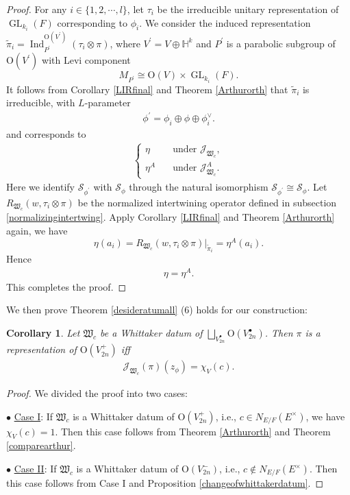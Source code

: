 \documentclass[article]{article}
\numberwithin{equation}{section}
\newtheorem{corollary}[theorem]{Corollary}
\theoremstyle{definition}
\DeclareMathOperator{\Ind}{Ind}
\DeclareMathOperator{\GL}{GL}
\begin{document}
\begin{proof}
For any $i\in \{1,2,\cdots, l\}$, let $\tau_{i}$ be the irreducible unitary representation of $\GL_{k_{i}}(F)$ corresponding to $\phi_{i}$. We consider the induced representation $\widetilde{\pi}_i=\Ind_{P^\prime}^{\mathrm O(V^\prime)}(\tau_i\otimes\pi)$, where $V^\prime= V\oplus \mathbb H^k$ and $P^\prime$ is a parabolic subgroup of $\mathrm O(V^\prime)$ with Levi component $$M_{P^\prime}\cong \mathrm O(V)\times \GL_{k_{i}}(F).$$
It follows from Corollary \ref{LIRfinal} and Theorem \ref{Arthurorth} that $\widetilde{\pi}_i$ is irreducible, with $L$-parameter 
\begin{align*}
\phi^\prime =\phi_i \oplus \phi \oplus \phi_i^{\vee}.
\end{align*}
and corresponds to 
\begin{align*}
\begin{cases*}
\eta \quad &\mbox{under $\mathcal J_{\mathfrak W_c}$},\\
\eta^A \quad &\mbox{under $\mathcal J^A_{\mathfrak W_c}$}. 
\end{cases*}
\end{align*}
Here we identify $\mathcal S_{\phi^\prime}$ with $\mathcal {S}_{\phi}$ through the natural isomorphism $\mathcal S_{\phi^\prime}\cong \mathcal {S}_{\phi}$. Let $R_{\mathfrak W_c}(w,\tau_{i}\otimes\pi)$ be the normalized intertwining operator defined in subsection \ref{normalizingintertwing}. Apply Corollary \ref{LIRfinal} and Theorem \ref{Arthurorth} again, we  have 
\begin{equation}\label{102}
\eta(a_i)=R_{\mathfrak W_c}(w,\tau_{i}\otimes\pi)|_{\widetilde{\pi}_i}=\eta^A(a_i). 
\end{equation}
Hence 	
\begin{align*}
\eta=\eta^A.
\end{align*}
This completes the proof. 
\end{proof}


We then prove Theorem \ref{desideratumall} (6) holds for our construction: 
\begin{corollary}\label{plus}
	Let $\mathfrak W_c$ be a Whittaker datum of $\bigsqcup_{V_{2n}^{\bullet}}\mathrm O(V_{2n}^\bullet)$. Then $\pi$ is a representation of $\mathrm O(V_{2n}^+)$ iff 
	\begin{align*}
	\mathcal J_{\mathfrak W_c}(\pi)(z_{\phi})=\chi_{V}(c).
	\end{align*}
\end{corollary}
\begin{proof}
	We divided the proof into two cases: 
	
	$\bullet$ \underline{Case I}: If $\mathfrak W_c$ is a Whittaker datum of $\mathrm O(V_{2n}^+)$, i.e., $c\in N_{E/F}(E^\times)$, we have $\chi_{V}(c)=1$. Then this case follows from Theorem \ref{Arthurorth} and Theorem \ref{comparearthur}. 
	
	
	$\bullet$ \underline{Case II}: If $\mathfrak W_c$ is a Whittaker datum of $\mathrm O(V_{2n}^-)$, i.e., $c\notin N_{E/F}(E^\times)$. Then this case follows from Case I and Proposition \ref{changeofwhittakerdatum}. 
\end{proof}
\end{document}
